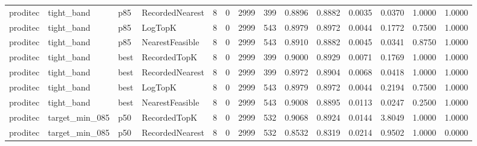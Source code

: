 \begin{tabular}{llllrrrrrrrrrr}
proditec &           tight\_band &    p85 & RecordedNearest &           8 &          0 &           2999 &                 399 &         0.8896 &          0.8882 &                    0.0035 &         0.0370 &                 1.0000 &                  1.0000 \\
proditec &           tight\_band &    p85 &         LogTopK &           8 &          0 &           2999 &                 543 &         0.8979 &          0.8972 &                    0.0044 &         0.1772 &                 0.7500 &                  1.0000 \\
proditec &           tight\_band &    p85 & NearestFeasible &           8 &          0 &           2999 &                 543 &         0.8910 &          0.8882 &                    0.0045 &         0.0341 &                 0.8750 &                  1.0000 \\
proditec &           tight\_band &   best &    RecordedTopK &           8 &          0 &           2999 &                 399 &         0.9000 &          0.8929 &                    0.0071 &         0.1769 &                 1.0000 &                  1.0000 \\
proditec &           tight\_band &   best & RecordedNearest &           8 &          0 &           2999 &                 399 &         0.8972 &          0.8904 &                    0.0068 &         0.0418 &                 1.0000 &                  1.0000 \\
proditec &           tight\_band &   best &         LogTopK &           8 &          0 &           2999 &                 543 &         0.8979 &          0.8972 &                    0.0044 &         0.2194 &                 0.7500 &                  1.0000 \\
proditec &           tight\_band &   best & NearestFeasible &           8 &          0 &           2999 &                 543 &         0.9008 &          0.8895 &                    0.0113 &         0.0247 &                 0.2500 &                  1.0000 \\
proditec &       target\_min\_085 &    p50 &    RecordedTopK &           8 &          0 &           2999 &                 532 &         0.9068 &          0.8924 &                    0.0144 &         3.8049 &                 1.0000 &                  1.0000 \\
proditec &       target\_min\_085 &    p50 & RecordedNearest &           8 &          0 &           2999 &                 532 &         0.8532 &          0.8319 &                    0.0214 &         0.9502 &                 1.0000 &                  0.0000 \\

\end{tabular}
